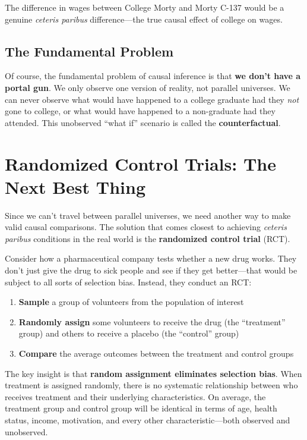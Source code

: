 \documentclass[
  letterpaper,
  DIV=11,
  numbers=noendperiod]{scrreprt}
\providecommand{\tightlist}{%
  \setlength{\itemsep}{0pt}\setlength{\parskip}{0pt}}
\begin{document}
The difference in wages between College Morty and Morty C-137 would be a
genuine \emph{ceteris paribus} difference---the true causal effect of
college on wages.

\subsection{The Fundamental Problem}\label{the-fundamental-problem}

Of course, the fundamental problem of causal inference is that
\textbf{we don't have a portal gun}. We only observe one version of
reality, not parallel universes. We can never observe what would have
happened to a college graduate had they \emph{not} gone to college, or
what would have happened to a non-graduate had they attended. This
unobserved ``what if'' scenario is called the \textbf{counterfactual}.

\section{Randomized Control Trials: The Next Best
Thing}\label{randomized-control-trials-the-next-best-thing}

Since we can't travel between parallel universes, we need another way to
make valid causal comparisons. The solution that comes closest to
achieving \emph{ceteris paribus} conditions in the real world is the
\textbf{randomized control trial} (RCT).

Consider how a pharmaceutical company tests whether a new drug works.
They don't just give the drug to sick people and see if they get
better---that would be subject to all sorts of selection bias. Instead,
they conduct an RCT:

\begin{enumerate}
\def\labelenumi{\arabic{enumi}.}
\tightlist
\item
  \textbf{Sample} a group of volunteers from the population of interest
\item
  \textbf{Randomly assign} some volunteers to receive the drug (the
  ``treatment'' group) and others to receive a placebo (the ``control''
  group)
\item
  \textbf{Compare} the average outcomes between the treatment and
  control groups
\end{enumerate}

The key insight is that \textbf{random assignment eliminates selection
bias}. When treatment is assigned randomly, there is no systematic
relationship between who receives treatment and their underlying
characteristics. On average, the treatment group and control group will
be identical in terms of age, health status, income, motivation, and
every other characteristic---both observed and unobserved.
\end{document}
